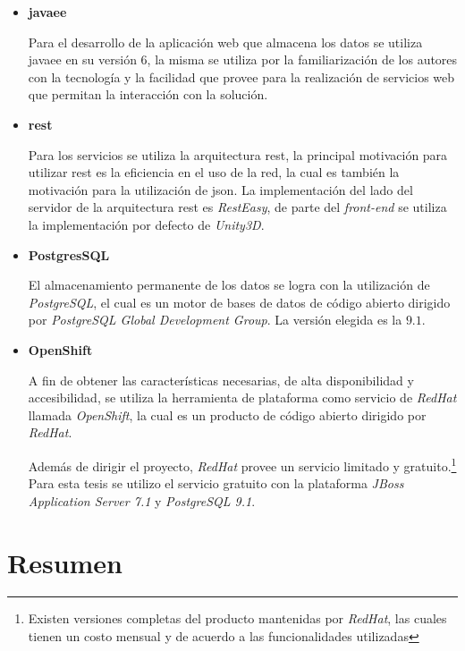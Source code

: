 \begin{itemize}
\item \textbf{\Gls{javaee}}

Para el desarrollo de la aplicación web que almacena los datos se utiliza
\Gls{javaee} en su versión $6$, la misma se utiliza por la familiarización de
los autores con la tecnología y la facilidad que provee para la
realización de servicios web que permitan la interacción con la solución.

\item \textbf{\Gls{rest}}

Para los servicios se utiliza la arquitectura \Gls{rest}, la principal
motivación para utilizar \Gls{rest} es la eficiencia en el uso de la
red\cite{pautasso2008restful}, la cual es también la motivación para la
utilización de \Gls{json}. La implementación del lado del servidor de la
arquitectura \Gls{rest} es \textit{RestEasy}, de parte del \textit{front-end} se utiliza
la implementación por defecto de \textit{Unity3D}.

\item \textbf{PostgresSQL}

El almacenamiento permanente de los datos se logra con la utilización de
\textit{PostgreSQL}, el cual es un motor de bases de datos de código abierto
dirigido por \textit{PostgreSQL Global
    Development Group}. La versión elegida es la $9.1$.

\item \textbf{OpenShift}

A fin de obtener las características necesarias, de alta disponibilidad y
accesibilidad, se utiliza la herramienta de plataforma como servicio de
\textit{RedHat} llamada \textit{OpenShift}, la cual es un producto de código
abierto dirigido por \textit{RedHat}.

Además de dirigir el proyecto, \textit{RedHat} provee un servicio limitado y
gratuito\cite{openshift:pricing}.\footnote{Existen versiones completas del
    producto mantenidas por \textit{RedHat}, las cuales tienen un costo mensual
    y de acuerdo a las funcionalidades utilizadas\cite{openshift:pricing}} Para
esta tesis se utilizo el servicio gratuito con la plataforma \textit{JBoss
    Application Server 7.1} y \textit{PostgreSQL 9.1}.

\end{itemize}

\section{Resumen}

